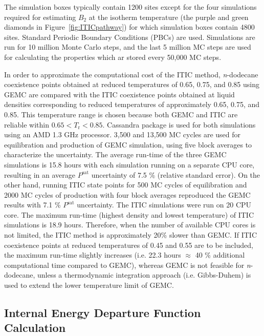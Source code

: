 \documentclass[5p,times]{elsarticle}
\begin{document}
The simulation boxes typically contain 1200 sites except for the four simulations required for estimating $B_2$ at the isotherm temperature (the purple and green diamonds in Figure~\ref{fig:ITICpathway}) for which simulation boxes contain 4800 sites. Standard Periodic Boundary Conditions (PBCs) are used. Simulations are run for 10 million Monte Carlo steps, and the last 5 million MC steps are used for calculating the properties which ar stored every 50,000 MC steps. 


In order to approximate the computational cost of the ITIC method, \textit{n}-dodecane  coexistence points obtained at reduced temperatures of 0.65, 0.75, and 0.85 using  GEMC are compared with the ITIC coexistence points obtained at liquid densities corresponding to reduced temperatures of approximately 0.65, 0.75, and 0.85. This temperature range is chosen because both  GEMC and ITIC are reliable within $0.65<T_\mathrm{r}<0.85$. Cassandra package is used for both simulations using an AMD 1.3 GHz processor. 3,500 and 13,500 MC cycles are used for equilibration and production of GEMC simulation, using five block averages to characterize the uncertainty. The average run-time of the three GEMC simulations is 15.8 hours with each simulation running on a separate CPU core, resulting in an average $P^\mathrm{sat}$ uncertainty of 7.5 \% (relative standard error). On the other hand, running ITIC state points for 500 MC cycles of equilibration and 2000 MC cycles of production with four block averages reproduced the GEMC results with 7.1 \% $P^\mathrm{sat}$ uncertainty. The ITIC simulations were run on 20 CPU core. The maximum run-time (highest density and lowest temperature) of ITIC simulations is 18.9 hours. Therefore, when the number of available CPU cores is not limited, the ITIC method is approximately 20\% slower than GEMC. If ITIC coexistence points at reduced temperatures of 0.45 and 0.55 are to be included, the maximum run-time slightly increases (i.e. 22.3 hours $\approx$ 40 \% additional computational time compared to GEMC), whereas GEMC is not feasible for \textit{n}-dodecane, unless a thermodynamic integration approach (i.e. Gibbs-Duhem) is used to extend the lower temperature limit of GEMC.

\subsection{Internal Energy Departure Function Calculation}\label{sec:udepCalc}
\end{document}
